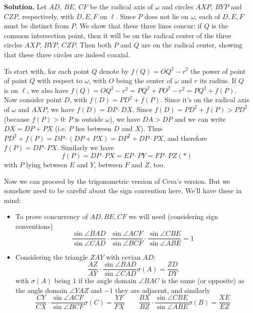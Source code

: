 \documentclass[11pt,a4paper]{article}
\begin{document}
\begin{enumerate}
	\textbf{Solution.} Let $AD$, $BE$, $CF$ be the radical axis of $\omega$ and circles $AXP$, $BYP$ and $CZP$, respectively, with $D, E, F$ on $\ell$. Since $P$ does not lie on $\omega$, each of $D, E, F$ must be distinct from $P$. We show that these three lines concur: if $Q$ is the common intersection point, then it will be on the radical center of the three circles $AXP$, $BYP$, $CZP$. Then both $P$ and $Q$ are on the radical center, showing that these three circles are indeed coaxial. 
	
	To start with, for each point $Q$ denote by $f(Q)=OQ^2-r^2$ the power of point of point $Q$ with respect to $\omega$, with $O$ being the center of $\omega$ and $r$ its radius. If $Q$ is on $\ell$, we also have $f(Q)=OQ^2-r^2=PQ^2+PO^2-r^2=PQ^2+f(P)$. 
	Now consider point $D$, with $f(D)=PD^2+f(P)$. Since it's on the radical axis of $\omega$ and $AXP$, we have $f(D)=DP\cdot DX$. Since $f(D)=PD^2+f(P)>PD^2$ (because $f(P)>0$: $P$ is outside $\omega$), we have $DA>DP$ and we can write $DX=DP+PX$ (i.e. $P$ lies between $D$ and $X$). 
	Thus $PD^2+f(P)=DP\cdot (DP+PX)=DP^2+DP\cdot PX$, and therefore $f(P)=DP\cdot PX$. Similarly we have 
	\[
	f(P)=DP\cdot PX=EP\cdot PY=FP\cdot PZ (*)
	\]
	with $P$ lying between $E$ and $Y$, between $F$ and $Z$, too. 
	
	Now we can proceed by the trigonometric version of Ceva's version. But we somehow need to be careful about the sign convention here. We'll have these in mind: 
	\begin{itemize}
		\item To prove concurrency of $AD, BE, CF$ we will need (considering sign conventions)
		\[
		\dfrac{\sin\angle BAD}{\sin\angle CAD}\cdot\dfrac{\sin\angle ACF}{\sin\angle BCF}\cdot\dfrac{\sin\angle CBE}{\sin\angle ABE} = 1
		\]
		
		\item Considering the triangle $ZAY$ with cevian $AD$: 
		\[
		\dfrac{AZ}{AY}\cdot \dfrac{\sin\angle BAD}{\sin\angle CAD}\sigma(A) = \dfrac{ZD}{DY}
		\]
		with $\sigma (A)$ being $1$ if the angle domain $\angle BAC$ is the same (or opposite) as the angle domain $\angle YAZ$ and $-1$ they are adjacent, 
		and similarly 
		\[
		\dfrac{CY}{CX}\cdot \dfrac{\sin\angle ACF}{\sin\angle BCF}\sigma(C) = \dfrac{YF}{FX}\qquad
		\dfrac{BX}{BZ}\cdot \dfrac{\sin\angle CBE}{\sin\angle ABE}\sigma(B) = \dfrac{XE}{EZ}
		\]
		

\end{itemize}
\end{enumerate}
\end{document}
